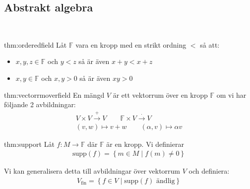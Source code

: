 \subsection{Abstrakt algebra}\hfill\\\par
\begin{theo}{thm:orderedfield}
  Låt $\mathbb{F}$ vara en kropp med en strikt ordning $<$ så att:\par
  \begin{itemize}
    \item $x,y,z\in\mathbb{F}$ och $y<z$ så är även $x+y<x+z$
    \item $x,y\in\mathbb{F}$ och $x,y>0$ så är även $xy>0$
  \end{itemize}
\end{theo}
\par\bigskip
\begin{theo}{thm:vectorrmoverfield}
  En mängd $V$ är ett vektorrum över en kropp $\mathbb{F}$ om vi har följande 2 avbildningar:
  \begin{equation*}
    \begin{gathered}
      V\times V\stackrel{+}{\to}V\qquad \mathbb{F}\times V\stackrel{\cdot}{\to} V\\
      (v,w)\mapsto v+w\qquad(\alpha, v)\mapsto\alpha v
    \end{gathered}
  \end{equation*}
\end{theo}
\par\bigskip
\begin{theo}{thm:support}
  Låt $f:M\to\mathbb{F}$ där $\mathbb{F}$ är en kropp. Vi definierar
  \begin{equation*}
    \begin{gathered}
    \text{supp}(f) = \left\{m\in M\;|\; f(m)\neq0\right\}
    \end{gathered}
  \end{equation*}\par
  \noindent Vi kan generalisera detta till avbildningar över vektorrum $V$ och definiera:
  \begin{equation*}
    \begin{gathered}
      V_{\text{fin}} = \left\{f\in V\;|\; \text{supp}(f)\text{ ändlig}\right\}
    \end{gathered}
  \end{equation*}
\end{theo}
\par\bigskip
